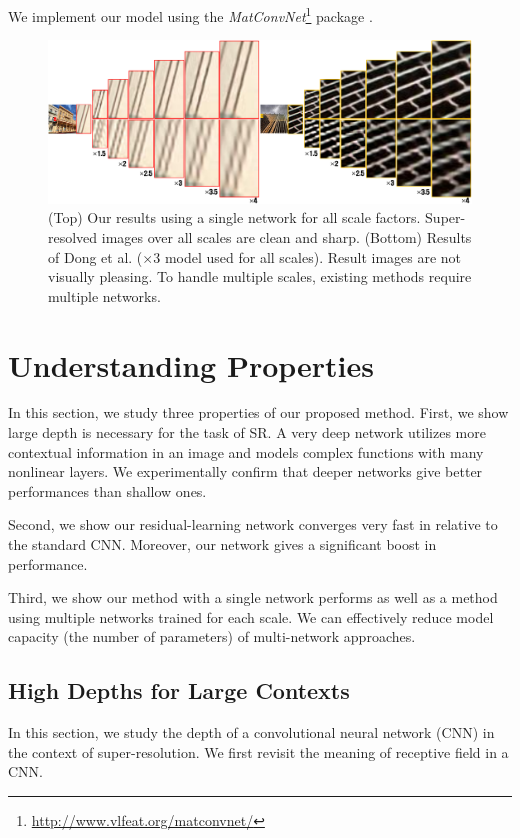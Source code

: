 \documentclass[10pt,twocolumn,letterpaper]{article}
\begin{document}
We implement our model using the \textit{MatConvNet}\footnote{\url{ http://www.vlfeat.org/matconvnet/}} package \cite{arXiv:1412.4564}.


\begin{figure}
\includegraphics[width=\textwidth]{figs/fig1_sffsr.pdf}
\caption{(Top) Our results using a single network for all scale factors. Super-resolved images over all scales are clean and sharp. (Bottom)  Results of Dong et al.  \cite{Dong2014} ($\times$3 model used for all scales). Result images are not visually pleasing. To handle multiple scales, existing methods require multiple networks.}
\end{figure}

\section{Understanding Properties}

In this section, we study three properties of our proposed method. First, we show large depth is necessary for the task of SR. A very deep network utilizes more contextual information in an image and models complex functions with many nonlinear layers. We experimentally confirm that deeper networks give better performances than shallow ones. 

Second, we show our residual-learning network converges very fast in relative to the standard CNN. Moreover, our network gives a significant boost in performance. 

Third, we show our method with a single network performs as well as a method using multiple networks trained for each scale. We can effectively reduce model capacity (the number of parameters) of multi-network approaches.


\subsection{High Depths for Large Contexts}
In this section, we study the depth of a convolutional neural network (CNN) in the context of super-resolution. We first revisit the meaning of receptive field in a CNN. 
\end{document}
